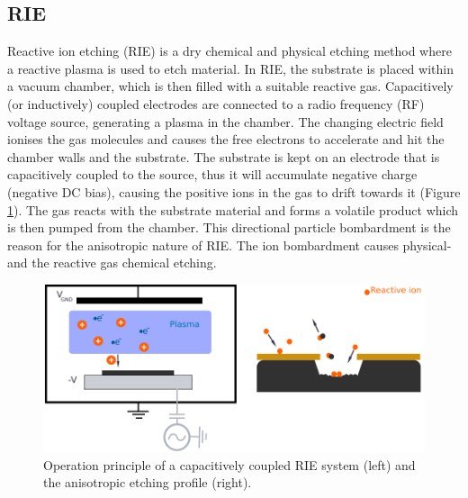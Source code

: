 \documentclass[final]{jyflluk}
\begin{document}
\label{sec:xx5}
\subsection{RIE}
Reactive ion etching (RIE) is a dry chemical and physical etching method where a reactive plasma is used to etch material. In RIE, the substrate is placed within a vacuum chamber, which is then filled with a suitable reactive gas. Capacitively (or inductively) coupled electrodes are connected to a radio frequency (RF) voltage source, generating a plasma in the chamber. The changing electric field ionises the gas molecules and causes the free electrons to accelerate and hit the chamber walls and the substrate.  The substrate is kept on an electrode that is capacitively coupled to the source, thus it will accumulate negative charge (negative DC bias), causing the positive ions in the gas to drift towards it (Figure \ref{fig:RIE}). The gas reacts with the substrate material and forms a volatile product which is then pumped from the chamber. This directional particle bombardment is the reason for the anisotropic nature of RIE. The ion bombardment causes physical-  and the reactive gas chemical etching. \cite{Franssila2008}

\begin{figure}[hb]
    \centering
    \includegraphics[width=1.0\textwidth]{images/RIE.pdf}
    \caption{Operation principle of a capacitively coupled RIE system (left) and the anisotropic etching profile (right).}
    \label{fig:RIE}
\end{figure}
\end{document}
